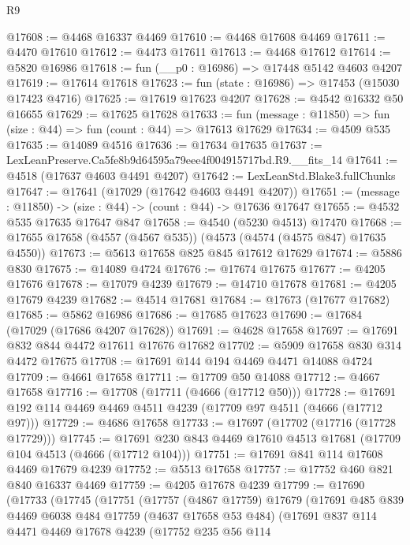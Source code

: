 \begin{lexlean}{R9}
\begin{coremodule}
@17608 := @4468 @16337 @4469
@17610 := @4468 @17608 @4469
@17611 := @4470 @17610
@17612 := @4473 @17611
@17613 := @4468 @17612
@17614 := @5820 @16986
@17618 := fun (__p0 : @16986) => @17448 @5142 @4603 @4207
@17619 := @17614 @17618
@17623 := fun (state : @16986) => @17453 (@15030 @17423 @4716)
@17625 := @17619 @17623 @4207
@17628 := @4542 @16332 @50 @16655
@17629 := @17625 @17628
@17633 := fun (message : @11850) => fun (size : @44) => fun (count : @44) => @17613 @17629
@17634 := @4509 @535
@17635 := @14089 @4516
@17636 := @17634 @17635
@17637 := LexLeanPreserve.Ca5fe8b9d64595a79eee4f004915717bd.R9.__fits_14
@17641 := @4518 (@17637 @4603 @4491 @4207)
@17642 := LexLeanStd.Blake3.fullChunks
@17647 := @17641 (@17029 (@17642 @4603 @4491 @4207))
@17651 := (message : @11850) -> (size : @44) -> (count : @44) -> @17636 @17647
@17655 := @4532 @535 @17635 @17647 @847
@17658 := @4540 (@5230 @4513) @17470
@17668 := @17655 @17658 (@4557 (@4567 @535)) (@4573 (@4574 (@4575 @847) @17635 @4550))
@17673 := @5613 @17658 @825 @845 @17612 @17629
@17674 := @5886 @830
@17675 := @14089 @4724
@17676 := @17674 @17675
@17677 := @4205 @17676
@17678 := @17079 @4239
@17679 := @14710 @17678
@17681 := @4205 @17679 @4239
@17682 := @4514 @17681
@17684 := @17673 (@17677 @17682)
@17685 := @5862 @16986
@17686 := @17685 @17623
@17690 := @17684 (@17029 (@17686 @4207 @17628))
@17691 := @4628 @17658
@17697 := @17691 @832 @844 @4472 @17611 @17676 @17682
@17702 := @5909 @17658 @830 @314 @4472 @17675
@17708 := @17691 @144 @194 @4469 @4471 @14088 @4724
@17709 := @4661 @17658
@17711 := @17709 @50 @14088
@17712 := @4667 @17658
@17716 := @17708 (@17711 (@4666 (@17712 @50)))
@17728 := @17691 @192 @114 @4469 @4469 @4511 @4239 (@17709 @97 @4511 (@4666 (@17712 @97)))
@17729 := @4686 @17658
@17733 := @17697 (@17702 (@17716 (@17728 @17729)))
@17745 := @17691 @230 @843 @4469 @17610 @4513 @17681 (@17709 @104 @4513 (@4666 (@17712 @104)))
@17751 := @17691 @841 @114 @17608 @4469 @17679 @4239
@17752 := @5513 @17658
@17757 := @17752 @460 @821 @840 @16337 @4469
@17759 := @4205 @17678 @4239
@17799 := @17690
    (@17733
      (@17745
        (@17751
          (@17757
            (@4867 @17759)
            @17679
            (@17691
              @485
              @839
              @4469
              @6038
              @484
              @17759
              (@4637 @17658 @53 @484)
              (@17691
                @837
                @114
                @4471
                @4469
                @17678
                @4239
                (@17752
                  @235
                  @56
                  @114

\end{coremodule}
\end{lexlean}
